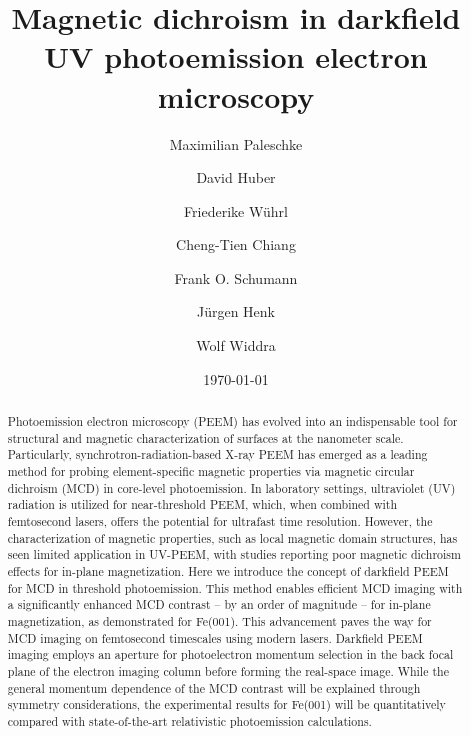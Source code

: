 \documentclass[prl,twocolumn,floatfix,superscriptaddress]{revtex4-2}
\begin{document}
\title{Magnetic dichroism in darkfield UV photoemission electron microscopy}
\author{Maximilian Paleschke}
\author{David Huber}
\author{Friederike Wührl}

\author{Cheng-Tien Chiang}

\author{Frank O. Schumann}

\author{Jürgen Henk}
\author{Wolf Widdra}


\date{\today}

\begin{abstract}
    Photoemission electron microscopy (PEEM) has evolved into an indispensable tool for structural and magnetic characterization of surfaces at the nanometer scale. Particularly, synchrotron-radiation-based X-ray PEEM has emerged as a leading method for probing element-specific magnetic properties via magnetic circular dichroism (MCD) in core-level photoemission. In laboratory settings, ultraviolet (UV) radiation is utilized for near-threshold PEEM, which, when combined with femtosecond lasers, offers the potential for ultrafast time resolution. However, the characterization of magnetic properties, such as local magnetic domain structures, has seen limited application in UV-PEEM, with studies reporting poor magnetic dichroism effects for in-plane magnetization. Here we introduce the concept of darkfield PEEM for MCD in threshold photoemission. This method enables efficient MCD imaging with a significantly enhanced MCD contrast -- by an order of magnitude -- for in-plane magnetization, as demonstrated for Fe(001). This advancement paves the way for MCD imaging on femtosecond timescales using modern lasers. Darkfield PEEM imaging employs an aperture for photoelectron momentum selection in the back focal plane of the electron imaging column before forming the real-space image. While the general momentum dependence of the MCD contrast will be explained through symmetry considerations, the experimental results for Fe(001) will be quantitatively compared with state-of-the-art relativistic photoemission calculations.
\end{abstract}
\end{document}
